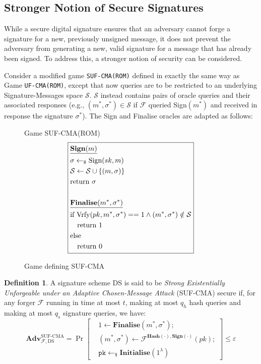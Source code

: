 \documentclass[]{final_report}
\theoremstyle{definition}
\newtheorem{definition}{Definition}[chapter]
\begin{document}
\subsection{Stronger Notion of Secure Signatures}
While a secure digital signature ensures that an adversary cannot forge a signature for a new, previously unsigned message, it does not prevent the adversary from generating a new, valid signature for a message that has already been signed. To address this, a stronger notion of security can be considered.

Consider a modified game \texttt{SUF-CMA(ROM)} defined in exactly the same way as Game \texttt{UF-CMA(ROM)}, except that  now queries are to be restricted to an underlying Signature-Messages space $\mathcal{S}$. $\mathcal{S}$ instead contains pairs of oracle queries and their associated responses (e.g., $(m^*, \sigma^*) \in \mathcal{S}$ if  $\mathcal{F}$ queried Sign$(m^*)$ and received in response the signature $\sigma^*$). The Sign and Finalise oracles are adapted as follows:
\begin{figure}[H]
\centering
\hfill Game SUF-CMA(ROM)\hfill\phantom{} 
\[
\boxed{
\begin{aligned}
&\underline{\textbf{\text{Sign}}(m)} \\
&\sigma \leftarrow_{\$} \text{Sign}(sk, m) \\
&\mathcal{S} \leftarrow \mathcal{S} \cup\{(m, \sigma)\} \\
&\text{return } \sigma \\
\\
&\underline{\textbf{\text{Finalise}}(m^*, \sigma^*)} \\
&\text{if Vrfy}(pk, m^*, \sigma^*) == 1 \land (m^*, \sigma^*) \notin \mathcal{S} \\
&\quad \text{return } 1 \\
&\text{else} \\
&\quad \text{return } 0
\end{aligned}
}
\]
\caption{Game defining SUF-CMA}
\label{fig:crypto_game}
\end{figure} 
\begin{definition}
A signature scheme DS is said to be \emph{Strong Existentially Unforgeable under an Adaptive Chosen-Message Attack} (SUF-CMA) secure if, for any forger \(\mathcal{F}\) running in time at most \(t\), making at most \(q_h\) hash queries and making at most \(q_s\) signature queries, we have:
\[
\textbf{Adv}_{\mathcal{F},\text{DS}}^{\text{SUF-CMA}} = \Pr \left[ \begin{aligned} &1 \leftarrow \textbf{Finalise}(m^*, \sigma^*); \\ &(m^*, \sigma^*) \leftarrow \mathcal{F}^{\textbf{Hash}(\cdot),\textbf{Sign}(\cdot)}(pk); \\ &\texttt{pk} \leftarrow_{\$} \textbf{Initialise}(1^{\lambda}) \end{aligned} \right] \leq \varepsilon
\]
\end{definition}
\end{document}
